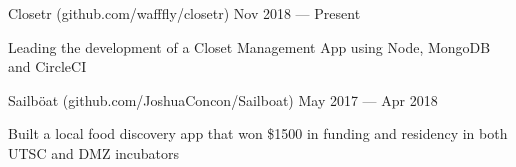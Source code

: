\begin{cventries}
  \cventry
    {}
    {Closetr (github.com/wafffly/closetr)}
    {}
    {Nov 2018 --- Present}
    {}
    {
      \begin{cvitems}
        \item {Leading the development of a Closet Management App using Node, MongoDB and CircleCI}
      \end{cvitems}
    }
  \cventry
    {}
    {Sailböat (github.com/JoshuaConcon/Sailboat)}
    {}
    {May 2017 --- Apr 2018}
    {}
    {
      \begin{cvitems}
        \item {Built a local food discovery app that won \$1500 in funding and residency in both UTSC and DMZ incubators}
      \end{cvitems}
    }
\end{cventries}